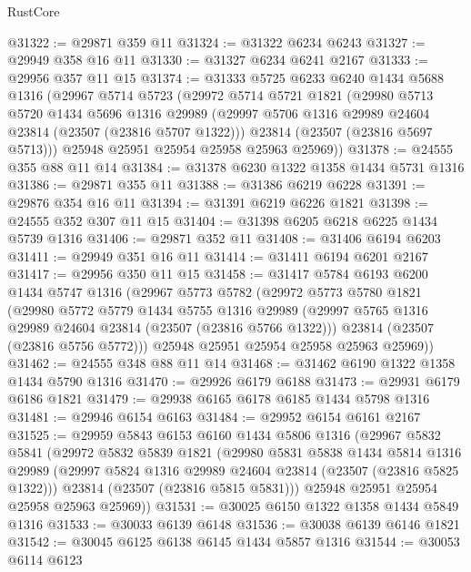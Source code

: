 \begin{lexlean}{RustCore}
\begin{coremodule}
@31322 := @29871 @359 @11
@31324 := @31322 @6234 @6243
@31327 := @29949 @358 @16 @11
@31330 := @31327 @6234 @6241 @2167
@31333 := @29956 @357 @11 @15
@31374 := @31333
    @5725
    @6233
    @6240
    @1434
    @5688
    @1316
    (@29967
      @5714
      @5723
      (@29972
        @5714
        @5721
        @1821
        (@29980
          @5713
          @5720
          @1434
          @5696
          @1316
          @29989
          (@29997 @5706 @1316 @29989 @24604 @23814 (@23507 (@23816 @5707 @1322)))
          @23814
          (@23507 (@23816 @5697 @5713)))
        @25948
        @25951
        @25954
        @25958
        @25963
        @25969))
@31378 := @24555 @355 @88 @11 @14
@31384 := @31378 @6230 @1322 @1358 @1434 @5731 @1316
@31386 := @29871 @355 @11
@31388 := @31386 @6219 @6228
@31391 := @29876 @354 @16 @11
@31394 := @31391 @6219 @6226 @1821
@31398 := @24555 @352 @307 @11 @15
@31404 := @31398 @6205 @6218 @6225 @1434 @5739 @1316
@31406 := @29871 @352 @11
@31408 := @31406 @6194 @6203
@31411 := @29949 @351 @16 @11
@31414 := @31411 @6194 @6201 @2167
@31417 := @29956 @350 @11 @15
@31458 := @31417
    @5784
    @6193
    @6200
    @1434
    @5747
    @1316
    (@29967
      @5773
      @5782
      (@29972
        @5773
        @5780
        @1821
        (@29980
          @5772
          @5779
          @1434
          @5755
          @1316
          @29989
          (@29997 @5765 @1316 @29989 @24604 @23814 (@23507 (@23816 @5766 @1322)))
          @23814
          (@23507 (@23816 @5756 @5772)))
        @25948
        @25951
        @25954
        @25958
        @25963
        @25969))
@31462 := @24555 @348 @88 @11 @14
@31468 := @31462 @6190 @1322 @1358 @1434 @5790 @1316
@31470 := @29926 @6179 @6188
@31473 := @29931 @6179 @6186 @1821
@31479 := @29938 @6165 @6178 @6185 @1434 @5798 @1316
@31481 := @29946 @6154 @6163
@31484 := @29952 @6154 @6161 @2167
@31525 := @29959
    @5843
    @6153
    @6160
    @1434
    @5806
    @1316
    (@29967
      @5832
      @5841
      (@29972
        @5832
        @5839
        @1821
        (@29980
          @5831
          @5838
          @1434
          @5814
          @1316
          @29989
          (@29997 @5824 @1316 @29989 @24604 @23814 (@23507 (@23816 @5825 @1322)))
          @23814
          (@23507 (@23816 @5815 @5831)))
        @25948
        @25951
        @25954
        @25958
        @25963
        @25969))
@31531 := @30025 @6150 @1322 @1358 @1434 @5849 @1316
@31533 := @30033 @6139 @6148
@31536 := @30038 @6139 @6146 @1821
@31542 := @30045 @6125 @6138 @6145 @1434 @5857 @1316
@31544 := @30053 @6114 @6123

\end{coremodule}
\end{lexlean}
